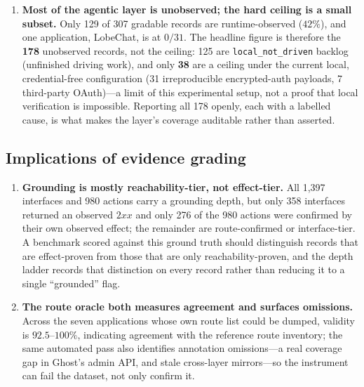 \documentclass[11pt,a4paper]{article}
\newcommand{\cd}[1]{\lstinline[basicstyle=\ttfamily\small]|#1|}
\begin{document}
\begin{enumerate}[leftmargin=1.6em,itemsep=3pt]
      untrusted-to-privileged path the schema records the controls attached to it
      (\cd{edge.control_ids} / \cd{tool.control_ids}) together with a declared
      \cd{enforcement_mode} and \cd{failure_mode}. This makes a missing or advisory-only
      control visible in the data; it does not by itself establish that a declared
      blocking control actually fires at runtime, which would require driving each path and
      observing the control act.
\item \textbf{Most of the agentic layer is unobserved; the hard ceiling is a small subset.}
      Only 129 of 307 gradable records are runtime-observed ($42\%$), and one application,
      LobeChat, is at $0/31$. The headline figure is therefore the \textbf{178} unobserved
      records, not the ceiling: 125 are \cd{local_not_driven} backlog (unfinished driving
      work), and only \textbf{38} are a ceiling under the current local, credential-free
      configuration (31 irreproducible encrypted-auth payloads, 7 third-party OAuth)---a
      limit of this experimental setup, not a proof that local verification is impossible.
      Reporting all 178 openly, each with a labelled cause, is what makes the layer's coverage
      auditable rather than asserted.
\end{enumerate}

\subsection{Implications of evidence grading}
\begin{enumerate}[leftmargin=1.6em,itemsep=3pt]
\item \textbf{Grounding is mostly reachability-tier, not effect-tier.} All 1{,}397 interfaces
      and 980 actions carry a grounding depth, but only 358 interfaces returned an observed
      $2xx$ and only 276 of the 980 actions were confirmed by their own observed effect; the
      remainder are route-confirmed or interface-tier. A benchmark scored against this ground
      truth should distinguish records that are effect-proven from those that are only
      reachability-proven, and the depth ladder records that distinction on every record
      rather than reducing it to a single ``grounded'' flag.
\item \textbf{The route oracle both measures agreement and surfaces omissions.} Across the
      seven applications whose own route list could be dumped, validity is $92.5$--$100\%$,
      indicating agreement with the reference route inventory; the same automated pass also
      identifies annotation omissions---a real coverage gap in Ghost's admin API, and stale
      cross-layer mirrors---so the instrument can fail the dataset, not only confirm it.
\end{enumerate}
\end{document}
